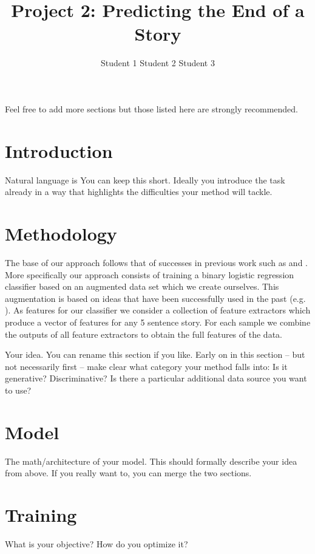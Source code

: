 \documentclass{article}
\title{Project 2: Predicting the End of a Story}
\author{Student 1 \qquad Student 2 \qquad Student 3}
\begin{document}

\maketitle


Feel free to add more sections but those listed here are strongly recommended.
\section{Introduction}
Natural language is
You can keep this short. Ideally you introduce the task already in a way that highlights the difficulties  your method will tackle.
\section{Methodology}
The base of our approach follows that of successes in previous work such as \cite{UWNLP} and \cite{COGCOMP}. More specifically our approach consists of training a binary logistic regression classifier based on an augmented data set which we create ourselves. This augmentation is based on ideas that have been successfully used in the past (e.g. \cite{LSTMClassifier}). As features for our classifier we consider a collection of feature extractors which produce a vector of features for any 5 sentence story. For each sample we combine the outputs of all feature extractors to obtain the full features of the data.

Your idea. You can rename this section if you like. Early on in this section -- but not necessarily first -- make clear what category your method falls into: Is it generative? Discriminative? Is there a particular additional data source you want to use?

\section{Model}
\label{sec:model}

The math/architecture of your model. This should formally describe your idea from above. If you really want to, you can merge the two sections.
\section{Training}
What is your objective? How do you optimize it?
\end{document}
